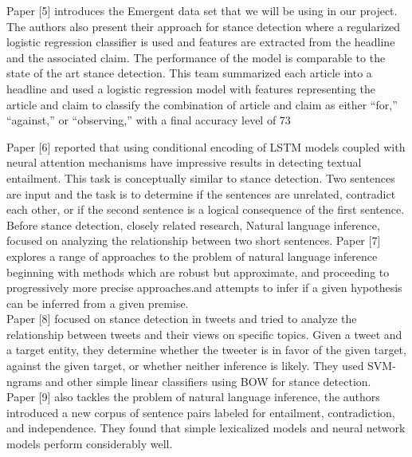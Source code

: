\documentclass[11pt]{extarticle}
\begin{document}
Paper [5] introduces the Emergent data set that we will be using in our project. The authors also present their approach for stance detection where a regularized logistic regression classifier is used and features are extracted from the headline and the associated claim. The performance of the model is comparable to the state of the art stance detection. This team summarized each article into a headline and used a logistic regression model with features representing the article and claim to classify the combination of article and claim as either “for,” “against,” or “observing,” with a final accuracy level of 73%

Paper [6] reported that using conditional encoding of LSTM models coupled with neural attention mechanisms have impressive results in detecting textual entailment. This task is conceptually similar to stance detection. Two sentences are input and the task is to determine if the sentences are unrelated, contradict each other, or if the second sentence is a logical consequence of the first sentence.\\
Before stance detection, closely related research, Natural language inference, focused on analyzing the relationship between two short sentences. Paper [7] explores a range of approaches to the problem of natural language inference beginning with methods which are robust but approximate, and proceeding to progressively more precise approaches.and attempts to infer if a given hypothesis can be inferred from a given premise.\\


Paper [8] focused on stance detection in tweets and tried to analyze the relationship between tweets and their views on specific topics. Given a tweet and a target entity, they determine whether the tweeter is in favor of the given target, against the given target, or whether neither inference is likely. They used SVM-ngrams and other simple linear classifiers using BOW for stance detection. \\

Paper [9] also tackles the problem of natural language inference, the authors introduced a new corpus of sentence pairs labeled for entailment, contradiction, and independence. They found that simple lexicalized models and neural network models perform considerably well.\\
\end{document}
